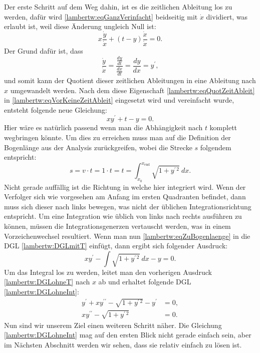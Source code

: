 Der erste Schritt auf dem Weg dahin, ist es die zeitlichen Ableitung los zu werden, dafür wird \eqref{lambertw:eqGanzVerinfacht} beidseitig mit \(\dot{x}\) dividiert, was erlaubt ist, weil diese Änderung ungleich Null ist:
\begin{equation}
	x \frac{\dot{y}}{\dot{x}} + (t-y) \frac{\dot{x}}{\dot{x}}
	= 0.
	\label{lambertw:eqVorKeineZeitAbleit}
\end{equation}
Der Grund dafür ist, dass
\begin{equation}
	\frac{\displaystyle\dot{y}}{\displaystyle\dot{x}} 
	= \frac{\displaystyle\frac{dy}{dt}}{\displaystyle\frac{dx}{dt}}  
	= \frac{dy}{dx}
	= y^{\prime},
	\label{lambertw:eqQuotZeitAbleit}
\end{equation}
und somit kann der Quotient dieser zeitlichen Ableitungen in eine Ableitung nach \(x\) umgewandelt werden.
Nach dem diese Eigenschaft \eqref{lambertw:eqQuotZeitAbleit} in \eqref{lambertw:eqVorKeineZeitAbleit} eingesetzt wird und vereinfacht wurde, entsteht folgende neue Gleichung:
\begin{equation}
	x y^{\prime} + t - y
	= 0.
	\label{lambertw:DGLmitT}
\end{equation}
Hier wäre es natürlich passend wenn man die Abhängigkeit nach \(t\) komplett wegbringen könnte. Um dies zu erreichen muss man auf die Definition der Bogenlänge aus der Analysis zurückgreifen, wobei die Strecke \(s\) folgendem entspricht:
\begin{equation}
	s
	= 
	v \cdot t
	=
	1 \cdot t
	=
	t
	=
	\int_{\displaystyle x_0}^{\displaystyle x_{\text{end}}}\sqrt{1+y^{\prime\, 2}} \: dx.
	\label{lambertw:eqZuBogenlaenge}
\end{equation}
Nicht gerade auffällig ist die Richtung in welche hier integriert wird. Wenn der Verfolger sich wie vorgesehen am Anfang im ersten Quadranten befindet, dann muss sich dieser nach links bewegen, was nicht der üblichen Integrationsrichtung entspricht. Um eine Integration wie üblich von links nach rechts ausführen zu können, müssen die Integrationsgenerzen vertauscht werden, was in einem Vorzeichenwechsel resultiert. Wenn man nun \eqref{lambertw:eqZuBogenlaenge} in die DGL \eqref{lambertw:DGLmitT} einfügt, dann ergibt sich folgender Ausdruck:
\begin{equation}
	x y^{\prime} - \int\sqrt{1+y^{\prime\, 2}} \: dx - y
	= 0.
	\label{lambertw:DGLohneT}
\end{equation}
Um das Integral los zu werden, leitet man den vorherigen Ausdruck \eqref{lambertw:DGLohneT} nach \(x\) ab und erhaltet folgende DGL \eqref{lambertw:DGLohneInt}:
\begin{align}
	y^{\prime}+ xy^{\prime\prime} - \sqrt{1+y^{\prime\, 2}} - y^{\prime}
	&= 0, \\
	xy^{\prime\prime} - \sqrt{1+y^{\prime\, 2}}
	&= 0.
	\label{lambertw:DGLohneInt}
\end{align}
Nun sind wir unserem Ziel einen weiteren Schritt näher. Die Gleichung \eqref{lambertw:DGLohneInt} mag auf den ersten Blick nicht gerade einfach sein, aber im Nächsten Abschnitt werden wir sehen, dass sie relativ einfach zu lösen ist.

